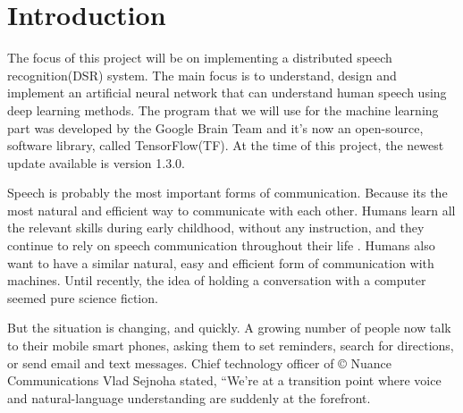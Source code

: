 \chapter{Introduction}\label{ch:introduction}

The focus of this project will be on implementing a distributed speech recognition(DSR) system.
 The main focus is to understand, design and implement an artificial neural network that can understand human speech using deep learning methods. 
 The program that we will use for the machine learning part was developed by the Google Brain Team and it's now an open-source, software library, called TensorFlow(TF). 
 At the time of this project, the newest update available is version 1.3.0. \cite{tensorflow2015-whitepaper}

Speech is probably the most important forms of communication. Because its the most natural and efficient way to communicate with each other. Humans learn all the relevant skills during early childhood, without any instruction, and they continue to rely on speech communication throughout their life \cite{kamblespeech}. Humans also want to have a similar natural, easy and efficient form of communication with machines. Until recently, the idea of holding a conversation with a computer seemed pure science fiction.

But the situation is changing, and quickly. A growing number of people now talk to their mobile smart phones, asking them to set reminders, search for directions, or send email and text messages. Chief technology officer of \copyright{} Nuance Communications Vlad Sejnoha stated, “We’re at a transition point where voice and natural-language understanding are suddenly at the forefront.




\cite{kamblespeech}
 






